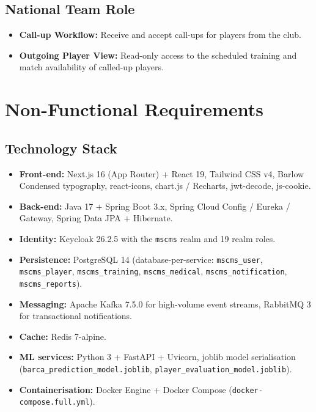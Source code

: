 \documentclass[12pt,a4paper,oneside]{report}
\begin{document}
\subsection*{National Team Role}
\begin{itemize}[leftmargin=*]
  \item \textbf{Call-up Workflow:} Receive and accept call-ups for
        players from the club.
  \item \textbf{Outgoing Player View:} Read-only access to the
        scheduled training and match availability of called-up
        players.
\end{itemize}

\section{Non-Functional Requirements}
\label{sec:non-functional-reqs}

\subsection*{Technology Stack}
\begin{itemize}[leftmargin=*]
  \item \textbf{Front-end:} Next.js 16 (App Router) + React 19,
        Tailwind CSS v4, Barlow Condensed typography, react-icons,
        chart.js / Recharts, jwt-decode, js-cookie.
  \item \textbf{Back-end:} Java 17 + Spring Boot 3.x, Spring Cloud
        Config / Eureka / Gateway, Spring Data JPA + Hibernate.
  \item \textbf{Identity:} Keycloak 26.2.5 with the \texttt{mscms}
        realm and 19 realm roles.
  \item \textbf{Persistence:} PostgreSQL 14 (database-per-service:
        \texttt{mscms\_user}, \texttt{mscms\_player},
        \texttt{mscms\_training}, \texttt{mscms\_medical},
        \texttt{mscms\_notification}, \texttt{mscms\_reports}).
  \item \textbf{Messaging:} Apache Kafka 7.5.0 for high-volume event
        streams, RabbitMQ 3 for transactional notifications.
  \item \textbf{Cache:} Redis 7-alpine.
  \item \textbf{ML services:} Python 3 + FastAPI + Uvicorn, joblib
        model serialisation
        (\texttt{barca\_prediction\_model.joblib},
        \texttt{player\_evaluation\_model.joblib}).
  \item \textbf{Containerisation:} Docker Engine + Docker Compose
        (\texttt{docker-compose.full.yml}).
\end{itemize}
\end{document}
